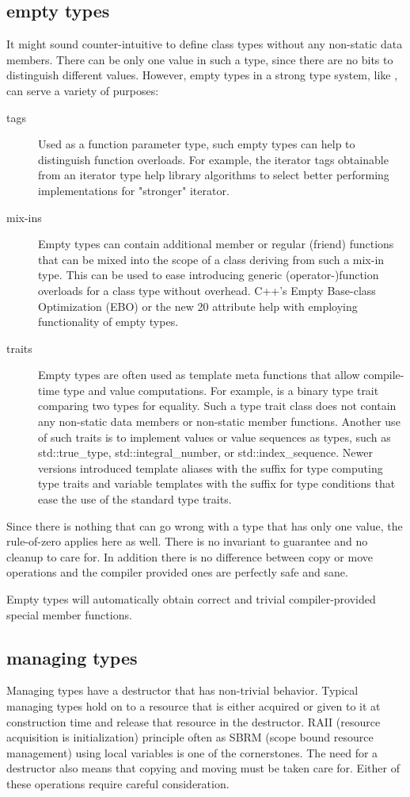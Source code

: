 \documentclass[ebook,11pt,article]{memoir}
\begin{document}
\subsection{empty types}
It might sound counter-intuitive to define class types without any non-static data members. There can be only one value in such a type, since there are no bits to distinguish different values. However, empty types in a strong type system, like \Cpp{}, can serve a variety of purposes:
\begin{description}
\item[tags] Used as a function parameter type, such empty types can help to distinguish function overloads. For example, the iterator tags obtainable from an iterator type help library algorithms to select better performing implementations for "stronger" iterator.
\item[mix-ins] Empty types can contain additional member or regular (friend) functions that can be mixed into the scope of a class deriving from such a mix-in type. This can be used to ease introducing generic (operator-)function overloads for a class type without overhead. C++'s Empty Base-class Optimization (EBO) or the new \Cpp{}20 attribute  help with employing functionality of empty types.
\item[traits] Empty types are often used as template meta functions that allow compile-time type and value computations. For example,  is a binary type trait comparing two types for equality. Such a type trait class does not contain any non-static data members or non-static member functions. Another use of such traits is to implement values or value sequences as types, such as std::true_type, std::integral_number, or std::index_sequence. Newer \Cpp{} versions introduced template aliases with the suffix  for type computing type traits and variable templates with the suffix  for type conditions that ease the use of the standard type traits.
\end{description}
Since there is nothing that can go wrong with a type that has only one value, the rule-of-zero applies here as well. There is no invariant to guarantee and no cleanup to care for. In addition there is no difference between copy or move operations and the compiler provided ones are perfectly safe and sane.

Empty types will automatically obtain correct and trivial compiler-provided special member functions.

\subsection{managing types}
Managing types have a destructor that has non-trivial behavior. Typical managing types hold on to a resource that is either acquired or given to it at construction time and release that resource in the destructor. \Cpp{} RAII (resource acquisition is initialization) principle often as SBRM (scope bound resource management) using local variables is one of the cornerstones.
The need for a destructor also means that copying and moving must be taken care for. Either of these operations require careful consideration.
\end{document}
